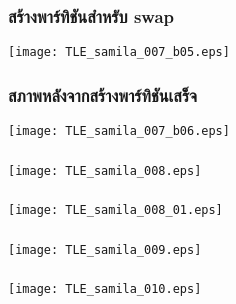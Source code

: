 \begin{thwbr}
\vfill
\subsubsection*{สร้างพาร์ทิชันสำหรับ swap}
\texttt{[image: TLE\_samila\_007\_b05.eps]}
\vfill

\subsubsection*{สภาพหลังจากสร้างพาร์ทิชันเสร็จ}
\texttt{[image: TLE\_samila\_007\_b06.eps]}
\vfill
\clearpage


\vfill
\subsubsection*{}\mymemo{}
\texttt{[image: TLE\_samila\_008.eps]}
\vfill

\subsubsection*{}\mymemo{}
\texttt{[image: TLE\_samila\_008\_01.eps]}
\vfill
\clearpage

\vfill
\subsubsection*{}\mymemo{}
\texttt{[image: TLE\_samila\_009.eps]}
\vfill

\subsubsection*{}\mymemo{}
\texttt{[image: TLE\_samila\_010.eps]}
\vfill
\clearpage



\end{thwbr}
\wbrin

